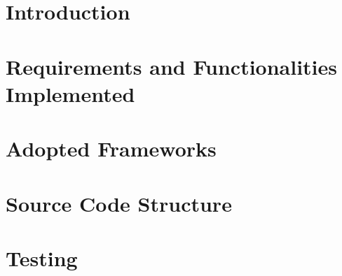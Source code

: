 \setcounter{page}{2}


\newpage
{}
\tableofcontents
\newpage
{}
\listoffigures

\clearpage
\section{Introduction}
\label{sect:introduction}


\clearpage
\section{Requirements and Functionalities Implemented}
\label{sect:requirements_functions}


\clearpage
\section{Adopted Frameworks}
\label{sect:adopted_frameworks}


\clearpage
\section{Source Code Structure}
\label{sect:source_structure}


\clearpage
\section{Testing}
\label{sect:testing}


